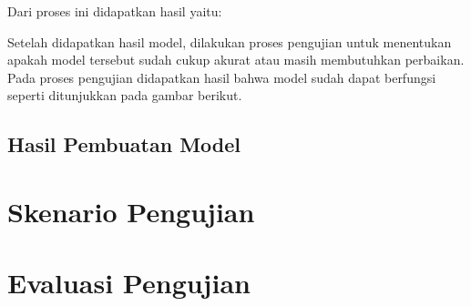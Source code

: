 Dari proses ini didapatkan hasil yaitu: \par

Setelah didapatkan hasil model, dilakukan proses pengujian untuk menentukan apakah model tersebut sudah cukup akurat atau masih membutuhkan perbaikan. Pada proses pengujian didapatkan hasil bahwa model sudah dapat berfungsi seperti ditunjukkan pada gambar berikut. \par

\subsection{Hasil Pembuatan Model}
\label{subsec:hasilmembangunmodel}


\section{Skenario Pengujian}
\label{sec:skenariopengujian}

\section{Evaluasi Pengujian}
\label{sec:analisispengujian}
